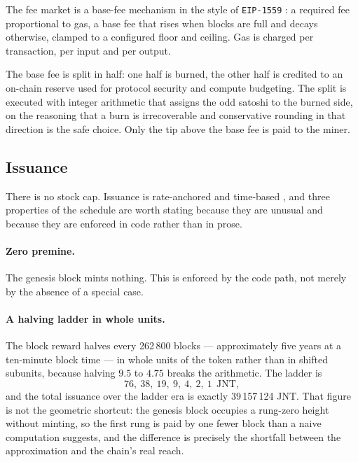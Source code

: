 \documentclass{article}
\begin{document}
The fee market is a base-fee mechanism in the style of \texttt{EIP-1559}
\cite{buterin2020eip1559}: a required fee proportional to gas, a base fee that
rises when blocks are full and decays otherwise, clamped to a configured floor
and ceiling. Gas is charged per transaction, per input and per output.

The base fee is split in half: one half is burned, the other half is credited
to an on-chain reserve used for protocol security and compute budgeting. The
split is executed with integer arithmetic that assigns the odd satoshi to the
burned side, on the reasoning that a burn is irrecoverable and conservative
rounding in that direction is the safe choice. Only the tip above the base fee
is paid to the miner.

\subsection{Issuance}
\label{sec:issuance}

There is no stock cap. Issuance is rate-anchored and time-based
\cite{jounit-monetary}, and three properties of the schedule are worth stating
because they are unusual and because they are enforced in code rather than in
prose.

\paragraph{Zero premine.} The genesis block mints nothing. This is enforced by
the code path, not merely by the absence of a special case.

\paragraph{A halving ladder in whole units.} The block reward halves every
262\,800 blocks --- approximately five years at a ten-minute block time --- in
whole units of the token rather than in shifted subunits, because halving
$9.5$ to $4.75$ breaks the arithmetic. The ladder is
\begin{equation}
76,\ 38,\ 19,\ 9,\ 4,\ 2,\ 1 \ \ \mathrm{JNT},
\label{eq:ladder}
\end{equation}
and the total issuance over the ladder era is exactly 39\,157\,124 JNT. That
figure is not the geometric shortcut: the genesis block occupies a rung-zero
height without minting, so the first rung is paid by one fewer block than a
naive computation suggests, and the difference is precisely the shortfall
between the approximation and the chain's real reach.
\end{document}
